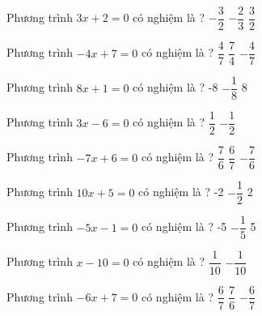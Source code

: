 \begin{ex} 
 Phương trình $3x+2=0$ có nghiệm là ? 
 {$- \dfrac{ 3 }{ 2 } $} 
 {\True $- \dfrac{ 2 }{ 3 } $} 
 {$ \dfrac{ 3 }{ 2 } $}  
 \loigiai{} 
 \end{ex} 
 
\begin{ex} 
 Phương trình $-4x+7=0$ có nghiệm là ? 
 {$ \dfrac{ 4 }{ 7 } $} 
 {\True $ \dfrac{ 7 }{ 4 } $} 
 {$- \dfrac{ 4 }{ 7 } $}  
 \loigiai{} 
 \end{ex} 
 
\begin{ex} 
 Phương trình $8x+1=0$ có nghiệm là ? 
 {-8} 
 {\True $- \dfrac{ 1 }{ 8 } $} 
 {8}  
 \loigiai{} 
 \end{ex} 
 
\begin{ex} 
 Phương trình $3x-6=0$ có nghiệm là ? 
 {$ \dfrac{ 1 }{ 2 } $} 
 {} 
 {$- \dfrac{ 1 }{ 2 } $}  
 \loigiai{} 
 \end{ex} 
 
\begin{ex} 
 Phương trình $-7x+6=0$ có nghiệm là ? 
 {$ \dfrac{ 7 }{ 6 } $} 
 {\True $ \dfrac{ 6 }{ 7 } $} 
 {$- \dfrac{ 7 }{ 6 } $}  
 \loigiai{} 
 \end{ex} 
 
\begin{ex} 
 Phương trình $10x+5=0$ có nghiệm là ? 
 {-2} 
 {\True $- \dfrac{ 1 }{ 2 } $} 
 {2}  
 \loigiai{} 
 \end{ex} 
 
\begin{ex} 
 Phương trình $-5x-1=0$ có nghiệm là ? 
 {-5} 
 {\True $- \dfrac{ 1 }{ 5 } $} 
 {5}  
 \loigiai{} 
 \end{ex} 
 
\begin{ex} 
 Phương trình $x-10=0$ có nghiệm là ? 
 {$ \dfrac{ 1 }{ 10 } $} 
 {} 
 {$- \dfrac{ 1 }{ 10 } $}  
 \loigiai{} 
 \end{ex} 
 
\begin{ex} 
 Phương trình $-6x+7=0$ có nghiệm là ? 
 {$ \dfrac{ 6 }{ 7 } $} 
 {\True $ \dfrac{ 7 }{ 6 } $} 
 {$- \dfrac{ 6 }{ 7 } $}  
 \loigiai{} 
 \end{ex} 
 

